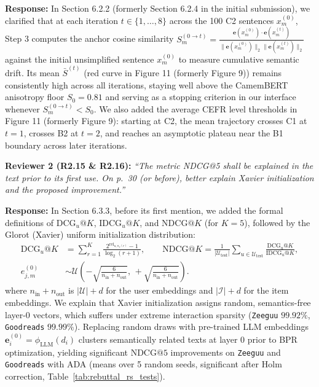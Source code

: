 \documentclass[11pt,a4paper]{article}
\newcommand{\mm}[1]{#1}
\begin{document}
\noindent\textbf{Response:}
In Section 6.2.2 (formerly Section 6.2.4 in the initial submission), we clarified that at each iteration $t \in \{1, \dots, 8\}$ across the 100 C2 sentences $x_m^{(0)}$, Step 3 computes the anchor cosine similarity $S_m^{(0 \to t)} = \frac{\mathbf{e}(x_m^{(0)}) \cdot \mathbf{e}(x_m^{(t)})}{\|\mathbf{e}(x_m^{(0)})\|_2 \|\mathbf{e}(x_m^{(t)})\|_2}$ against the initial unsimplified sentence $x_m^{(0)}$ to measure cumulative semantic drift. Its mean $\bar{S}^{(t)}$ (red curve in Figure 11 (formerly Figure 9)) remains consistently high across all iterations, staying well above the CamemBERT anisotropy floor $S_0 = 0.81$ and serving as a stopping criterion in our interface whenever $S_m^{(0 \to t)} < S_0$. We also added the average CEFR level thresholds in Figure 11 (formerly Figure 9): starting at C2, the mean trajectory crosses C1 at $t = 1$, crosses B2 at $t = 2$, and reaches an asymptotic plateau near the B1 boundary across later iterations.

\begin{reviewbox}
\textbf{Reviewer 2 (R2.15 \& R2.16):} \textit{``The metric NDCG@5 shall be explained in the text prior to its first use. On p.\ 30 (or before), better explain Xavier initialization and the proposed improvement.''}
\end{reviewbox}

\noindent\textbf{Response:}
In Section 6.3.3, before its first mention, we added the formal definitions of $\text{DCG}_u@K$, $\text{IDCG}_u@K$, and $\text{NDCG}@K$ (for $K = 5$), followed by the Glorot (Xavier) uniform initialization distribution:
\begin{equation}\label{eq:rebuttal_ndcg_xavier}
\begin{aligned}
\text{DCG}_u@K &= \sum_{r=1}^{K} \frac{2^{\text{rel}_{u, \pi_u(r)}} - 1}{\log_2(r + 1)}, \qquad
\text{NDCG}@K = \frac{1}{|\mathcal{U}_{\text{test}}|} \sum_{u \in \mathcal{U}_{\text{test}}} \frac{\text{DCG}_u@K}{\text{IDCG}_u@K}, \\
e_{j,m}^{(0)} &\sim \mathcal{U}\!\left(-\sqrt{\frac{6}{n_{\text{in}} + n_{\text{out}}}},\, +\sqrt{\frac{6}{n_{\text{in}} + n_{\text{out}}}}\right).
\end{aligned}
\end{equation}
\mm{where $n_{\text{in}} + n_{\text{out}}$ is $|\mathcal{U}| + d$ for the user embeddings and $|\mathcal{I}| + d$ for the item embeddings.} We explain that Xavier initialization assigns random, semantics-free layer-0 vectors, which suffers under extreme interaction sparsity (\texttt{Zeeguu} $99.92\%$, \texttt{Goodreads} $99.99\%$). Replacing random draws with pre-trained LLM embeddings $\mathbf{e}_i^{(0)} = \phi_{\text{LLM}}(d_i)$ clusters semantically related texts at layer 0 prior to BPR optimization, %
yielding significant $\text{NDCG}@5$ improvements on \texttt{Zeeguu} and \texttt{Goodreads} \mm{with ADA (means over 5 random seeds, significant after Holm correction, Table~\ref{tab:rebuttal_rs_tests})}.
\end{document}
